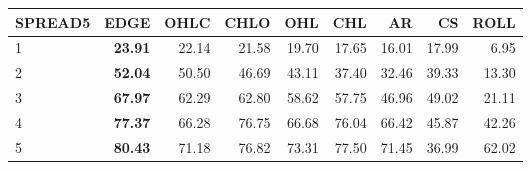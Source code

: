 \begin{table}[ht]
\centering
\begin{tabular}{lrrrrrrrr}
  \hline
SPREAD5 & EDGE & OHLC & CHLO & OHL & CHL & AR & CS & ROLL \\ 
  \hline
1 & \textbf{23.91} & 22.14 & 21.58 & 19.70 & 17.65 & 16.01 & 17.99 & 6.95 \\ 
  2 & \textbf{52.04} & 50.50 & 46.69 & 43.11 & 37.40 & 32.46 & 39.33 & 13.30 \\ 
  3 & \textbf{67.97} & 62.29 & 62.80 & 58.62 & 57.75 & 46.96 & 49.02 & 21.11 \\ 
  4 & \textbf{77.37} & 66.28 & 76.75 & 66.68 & 76.04 & 66.42 & 45.87 & 42.26 \\ 
  5 & \textbf{80.43} & 71.18 & 76.82 & 73.31 & 77.50 & 71.45 & 36.99 & 62.02 \\ 
   \hline
\end{tabular}
\end{table}
